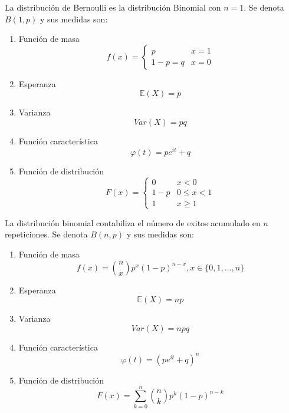 \begin{defn}[Bernoulli]
La distribución de Bernoulli es la distribución Binomial con $n=1$. Se denota $B(1,p)$ y sus medidas son:
\begin{enumerate}[label=(\roman*)]
    \item Función de masa 
    \[ f(x) =
    \begin{cases} 
      p & x=1 \\
      1-p=q & x = 0 
    \end{cases}
    \]
    \item Esperanza \[ \mathbb{E}(X) = p \]
    \item Varianza \[ Var(X) = pq \]
    \item Función característica \[ \varphi(t) = pe^{it} + q \]
    \item Función de distribución \[ F(x)  = 
    \begin{cases} 
        0 & x<0\\
        1- p & 0\leq x < 1 \\
        1 & x \geq 1 
    \end{cases}\]
\end{enumerate}

\end{defn}

\begin{defn}[Binomial]
La distribución binomial contabiliza el número de exitos acumulado en $n$ repeticiones. Se denota $B(n,p)$ y sus medidas son:
\begin{enumerate}[label=(\roman*)]
    \item Función de masa \[ f(x) = \binom{n}{x} p^x(1-p)^{n-x}, x\in\{0,1,...,n\}\]
    \item Esperanza \[ \mathbb{E}(X) = np \]
    \item Varianza \[ Var(X) = npq\]
    \item Función característica \[ \varphi(t) = (pe^{it} + q)^n \]
    \item Función de distribución \[ F(x) = \sum_{k=0}^n \binom{n}{k} p^k(1-p)^{n-k}\]
\end{enumerate}

\end{defn}

\begin{ejr}[2.15 , Schaum]

\end{ejr}

\begin{ejr}[2.30 , Schaum]

\end{ejr}

